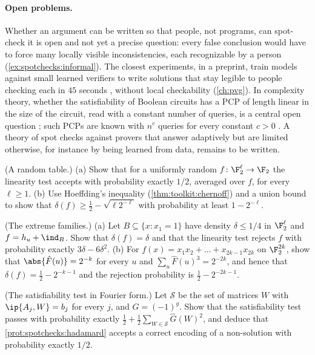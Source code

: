 \begin{refsection}
\paragraph{Open problems.} Whether an argument can be written so that people, not programs, can spot-check it is open and not yet a precise question: every false conclusion would have to force many locally visible inconsistencies, each recognizable by a person (\cref{ex:spotchecks:informal}). The closest experiments, in a preprint, train models against small learned verifiers to write solutions that stay legible to people checking each in $45$ seconds \parencite{KirchnerEtAl2024}, without local checkability (\cref{ch:pvg}). In complexity theory, whether the satisfiability of Boolean circuits has a PCP of length linear in the size of the circuit, read with a constant number of queries, is a central open question \parencite{RonZewiRothblum2024}; such PCPs are known with $n^c$ queries for every constant $c>0$ \parencite{BenSassonEtAl2016}. A theory of spot checks against provers that answer adaptively but are limited otherwise, for instance by being learned from data, remains to be written.

\begin{exercises}
\item \consolidation (A random table.) (a) Show that for a uniformly random $f\colon\F_2^\ell\to\F_2$ the linearity test accepts with probability exactly $1/2$, averaged over $f$, for every $\ell\ge1$.  (b) Use Hoeffding's inequality (\cref{thm:toolkit:chernoff}) and a union bound to show that $\delta(f)\ge\frac12-\sqrt{\ell2^{-\ell}}$ with probability at least $1-2^{-\ell}$.\label{ex:spotchecks:random}

\item \consolidation (The extreme families.) (a) Let $B\subseteq\{x:x_1=1\}$ have density $\delta\le1/4$ in $\F_2^\ell$ and $f=h_u+\ind_B$. Show that $\delta(f)=\delta$ and that the linearity test rejects $f$ with probability exactly $3\delta-6\delta^2$. (b) For $f(x)=x_1x_2+\dots+x_{2k-1}x_{2k}$ on $\F_2^{2k}$, show that $\abs{\hat F(u)}=2^{-k}$ for every $u$ and $\sum_u\hat F(u)^3=2^{-2k}$, and hence that $\delta(f)=\frac12-2^{-k-1}$ and the rejection probability is $\frac12-2^{-2k-1}$.\label{ex:spotchecks:families}

\item \consolidation (The satisfiability test in Fourier form.) Let $\mathcal S$ be the set of matrices $W$ with $\ip{A_j,W}=b_j$ for every $j$, and $G=(-1)^g$. Show that the satisfiability test passes with probability exactly $\frac12+\frac12\sum_{W\in\mathcal S}\hat G(W)^2$, and deduce that \cref{prot:spotchecks:hadamard} accepts a correct encoding of a non-solution with probability exactly $1/2$.\label{ex:spotchecks:satfourier}


\end{exercises}
\end{refsection}
